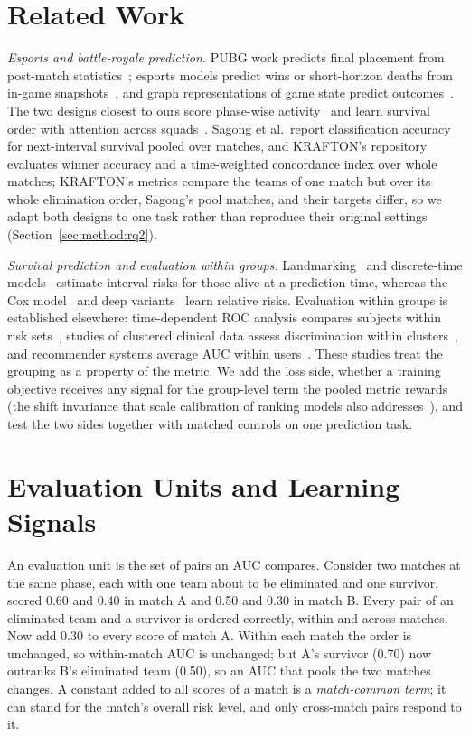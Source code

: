 \documentclass[sigconf,anonymous]{acmart}
\begin{document}
\section{Related Work}
\label{sec:related}
\emph{Esports and battle-royale prediction.} PUBG work predicts final placement from post-match statistics~\cite{KagglePUBG,LeeLee25}; esports models predict wins or short-horizon deaths from in-game snapshots~\cite{Hodge21,Katona19,Marshall22}, and graph representations of game state predict outcomes~\cite{Xenopoulos21}. The two designs closest to ours score phase-wise activity~\cite{Sagong25a} and learn survival order with attention across squads~\cite{KRAFTON}. Sagong et al.\ report classification accuracy for next-interval survival pooled over matches, and KRAFTON's repository evaluates winner accuracy and a time-weighted concordance index over whole matches; KRAFTON's metrics compare the teams of one match but over its whole elimination order, Sagong's pool matches, and their targets differ, so we adapt both designs to one task rather than reproduce their original settings (Section~\ref{sec:method:rq2}).

\emph{Survival prediction and evaluation within groups.} Landmarking~\cite{vanHouwelingen07} and discrete-time models~\cite{SingerWillett93,Gensheimer19} estimate interval risks for those alive at a prediction time, whereas the Cox model~\cite{Cox72} and deep variants~\cite{DeepHit18,DynamicDeepHit20} learn relative risks. Evaluation within groups is established elsewhere: time-dependent ROC analysis compares subjects within risk sets~\cite{HeagertyZheng05}, studies of clustered clinical data assess discrimination within clusters~\cite{vanKlaveren14}, and recommender systems average AUC within users~\cite{Zhou18}. These studies treat the grouping as a property of the metric. We add the loss side, whether a training objective receives any signal for the group-level term the pooled metric rewards (the shift invariance that scale calibration of ranking models also addresses~\cite{Yan22}), and test the two sides together with matched controls on one prediction task.

\section{Evaluation Units and Learning Signals}
\label{sec:account}
An evaluation unit is the set of pairs an AUC compares. Consider two matches at the same phase, each with one team about to be eliminated and one survivor, scored 0.60 and 0.40 in match A and 0.50 and 0.30 in match B. Every pair of an eliminated team and a survivor is ordered correctly, within and across matches. Now add 0.30 to every score of match A. Within each match the order is unchanged, so within-match AUC is unchanged; but A's survivor (0.70) now outranks B's eliminated team (0.50), so an AUC that pools the two matches changes. A constant added to all scores of a match is a \emph{match-common term}; it can stand for the match's overall risk level, and only cross-match pairs respond to it.
\end{document}

